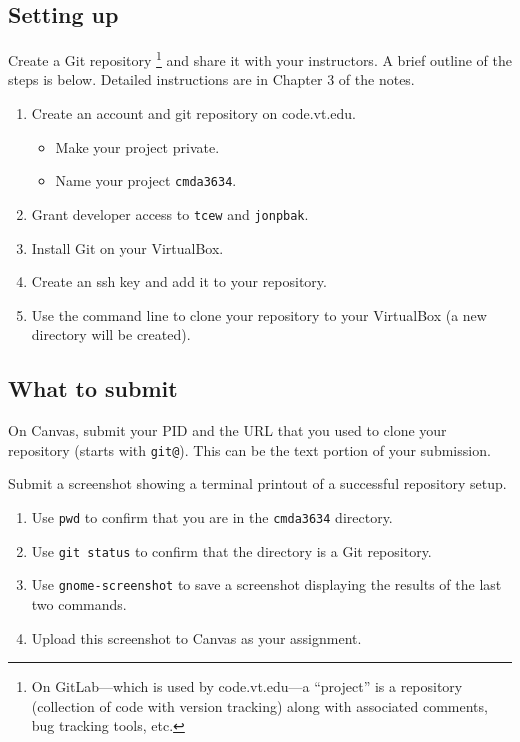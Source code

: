 \subsection*{Setting up}
Create a Git repository%
\footnote{On GitLab---which is used by code.vt.edu---a ``project'' is a repository (collection of code with version tracking) along with associated comments, bug tracking tools, etc.}
and share it with your instructors.
A brief outline of the steps is below.
Detailed instructions are in Chapter 3 of the notes.
\begin{enumerate}
\item Create an account and git repository on code.vt.edu.
\begin{itemize}
    \item Make your project private.
    \item Name your project \texttt{cmda3634}.
\end{itemize}
\item Grant developer access to \texttt{tcew} and \texttt{jonpbak}.
\item Install Git on your VirtualBox.
\item Create an ssh key and add it to your repository.
\item Use the command line to clone your repository to your VirtualBox (a new directory will be created).
\end{enumerate}
\subsection*{What to submit}
On Canvas, submit your PID and the URL that you used to clone your repository (starts with \texttt{git@}).
This can be the text portion of your submission.

Submit a screenshot showing a terminal printout of a successful repository setup.
\begin{enumerate}
    \item Use \texttt{pwd} to confirm that you are in the \texttt{cmda3634} directory.
    \item Use \texttt{git status} to confirm that the directory is a Git repository.
    \item Use \texttt{gnome-screenshot} to save a screenshot displaying the results of the last two commands.
    \item Upload this screenshot to Canvas as your assignment.
\end{enumerate}